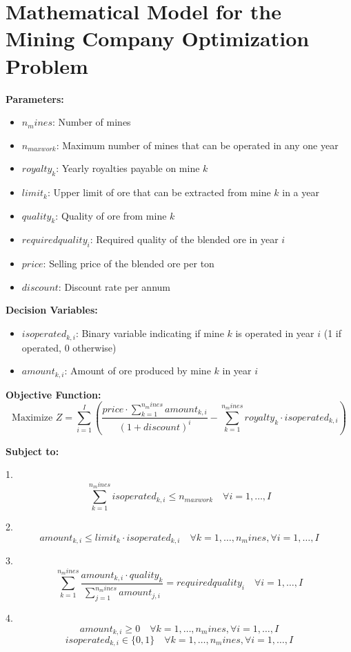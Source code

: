 \documentclass{article}
\begin{document}
\section*{Mathematical Model for the Mining Company Optimization Problem}

\textbf{Parameters:}
\begin{itemize}
    \item \( n_mines \): Number of mines
    \item \( n_{maxwork} \): Maximum number of mines that can be operated in any one year
    \item \( royalty_k \): Yearly royalties payable on mine \( k \)
    \item \( limit_k \): Upper limit of ore that can be extracted from mine \( k \) in a year
    \item \( quality_k \): Quality of ore from mine \( k \)
    \item \( requiredquality_i \): Required quality of the blended ore in year \( i \)
    \item \( price \): Selling price of the blended ore per ton
    \item \( discount \): Discount rate per annum
\end{itemize}

\textbf{Decision Variables:}
\begin{itemize}
    \item \( isoperated_{k,i} \): Binary variable indicating if mine \( k \) is operated in year \( i \) (1 if operated, 0 otherwise)
    \item \( amount_{k,i} \): Amount of ore produced by mine \( k \) in year \( i \)
\end{itemize}

\textbf{Objective Function:}
\[
\text{Maximize } Z = \sum_{i=1}^{I} \left( \frac{price \cdot \sum_{k=1}^{n_mines} amount_{k,i}}{(1 + discount)^{i}} - \sum_{k=1}^{n_mines} royalty_k \cdot isoperated_{k,i} \right)
\]

\textbf{Subject to:}

1. 
\[
\sum_{k=1}^{n_mines} isoperated_{k,i} \leq n_{maxwork} \quad \forall i = 1, \ldots, I
\]

2. 
\[
amount_{k,i} \leq limit_k \cdot isoperated_{k,i} \quad \forall k = 1, \ldots, n_mines, \forall i = 1, \ldots, I
\]

3. 
\[
\sum_{k=1}^{n_mines} \frac{amount_{k,i} \cdot quality_k}{\sum_{j=1}^{n_mines} amount_{j,i}} = requiredquality_i \quad \forall i = 1, \ldots, I
\]

4. 
\[
amount_{k,i} \geq 0 \quad \forall k = 1, \ldots, n_mines, \forall i = 1, \ldots, I
\]
\[
isoperated_{k,i} \in \{0, 1\} \quad \forall k = 1, \ldots, n_mines, \forall i = 1, \ldots, I
\]
\end{document}
